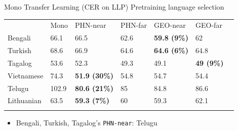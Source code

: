 \documentclass{beamer}
\begin{document}
\begin{frame}{Mono Transfer Learning (CER on LLP)}
  Pretraining language selection
 \begin{table}[]
\begin{tabular}{lllllll}
\cline{2-6}
\multicolumn{1}{l|}{}            & \multicolumn{1}{l|}{Mono}  & \multicolumn{1}{l|}{PHN-near}             & \multicolumn{1}{l|}{PHN-far} & \multicolumn{1}{l|}{GEO-near}            & \multicolumn{1}{l|}{GEO-far}           &  \\ \cline{1-6}
\multicolumn{1}{|l|}{Bengali}    & \multicolumn{1}{l|}{66.1}  & \multicolumn{1}{l|}{66.5}                 & \multicolumn{1}{l|}{62.6}    & \multicolumn{1}{l|}{\textbf{59.8 (9\%)}} & \multicolumn{1}{l|}{62}                &  \\ \cline{1-6}
\multicolumn{1}{|l|}{Turkish}    & \multicolumn{1}{l|}{68.6}  & \multicolumn{1}{l|}{66.9}                 & \multicolumn{1}{l|}{64.6}    & \multicolumn{1}{l|}{\textbf{64.6 (6\%)}} & \multicolumn{1}{l|}{64.8}              &  \\ \cline{1-6}
\multicolumn{1}{|l|}{Tagalog}    & \multicolumn{1}{l|}{53.6}  & \multicolumn{1}{l|}{52.3}                 & \multicolumn{1}{l|}{49.3}    & \multicolumn{1}{l|}{49.1}                & \multicolumn{1}{l|}{\textbf{49 (9\%)}} &  \\ \cline{1-6}
\multicolumn{1}{|l|}{Vietnamese} & \multicolumn{1}{l|}{74.3}  & \multicolumn{1}{l|}{\textbf{51.9 (30\%)}} & \multicolumn{1}{l|}{54.8}    & \multicolumn{1}{l|}{54.7}                & \multicolumn{1}{l|}{54.4}              &  \\ \cline{1-6}
\multicolumn{1}{|l|}{Telugu}     & \multicolumn{1}{l|}{102.9} & \multicolumn{1}{l|}{\textbf{80.6 (21\%)}} & \multicolumn{1}{l|}{85}      & \multicolumn{1}{l|}{84.8}                & \multicolumn{1}{l|}{86.6}              &  \\ \cline{1-6}
\multicolumn{1}{|l|}{Lithuanian} & \multicolumn{1}{l|}{63.5}  & \multicolumn{1}{l|}{\textbf{59.3 (7\%)}}  & \multicolumn{1}{l|}{60}      & \multicolumn{1}{l|}{59.3}                & \multicolumn{1}{l|}{62.1}              &  \\ \cline{1-6}
                                 &                            &                                           &                              &                                          &                                        & 
\end{tabular}
\label{tab:cer-trans}
\end{table}
\begin{itemize}
  \item Bengali, Turkish, Tagalog's \texttt{PHN-near}: Telugu
\end{itemize}
\end{frame}
\end{document}
